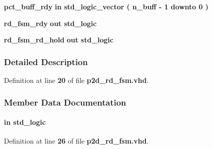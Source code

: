 \begin{DoxyCompactItemize}
\item 
{\bf pct\+\_\+buff\+\_\+rdy}  {\bfseries {\bfseries \textcolor{keywordflow}{in}\textcolor{vhdlchar}{ }}} {\bfseries \textcolor{comment}{std\+\_\+logic\+\_\+vector}\textcolor{vhdlchar}{ }\textcolor{vhdlchar}{(}\textcolor{vhdlchar}{ }\textcolor{vhdlchar}{ }\textcolor{vhdlchar}{ }\textcolor{vhdlchar}{ }{\bfseries {\bf n\+\_\+buff}} \textcolor{vhdlchar}{-\/}\textcolor{vhdlchar}{ } \textcolor{vhdldigit}{1} \textcolor{vhdlchar}{ }\textcolor{keywordflow}{downto}\textcolor{vhdlchar}{ }\textcolor{vhdlchar}{ } \textcolor{vhdldigit}{0} \textcolor{vhdlchar}{ }\textcolor{vhdlchar}{)}\textcolor{vhdlchar}{ }} 
\item 
{\bf rd\+\_\+fsm\+\_\+rdy}  {\bfseries {\bfseries \textcolor{keywordflow}{out}\textcolor{vhdlchar}{ }}} {\bfseries \textcolor{comment}{std\+\_\+logic}\textcolor{vhdlchar}{ }} 
\item 
{\bf rd\+\_\+fsm\+\_\+rd\+\_\+hold}  {\bfseries {\bfseries \textcolor{keywordflow}{out}\textcolor{vhdlchar}{ }}} {\bfseries \textcolor{comment}{std\+\_\+logic}\textcolor{vhdlchar}{ }} 
\end{DoxyCompactItemize}


\subsubsection{Detailed Description}


Definition at line {\bf 20} of file {\bf p2d\+\_\+rd\+\_\+fsm.\+vhd}.



\subsubsection{Member Data Documentation}
\paragraph[{clk}]{ {\bfseries \textcolor{keywordflow}{in}\textcolor{vhdlchar}{ }} {\bfseries \textcolor{comment}{std\+\_\+logic}\textcolor{vhdlchar}{ }} \hspace{0.3cm}{\ttfamily [Port]}}\label{classp2d__rd__fsm_a4a4609c199d30b3adebbeb3a01276ec5}


Definition at line {\bf 26} of file {\bf p2d\+\_\+rd\+\_\+fsm.\+vhd}.

